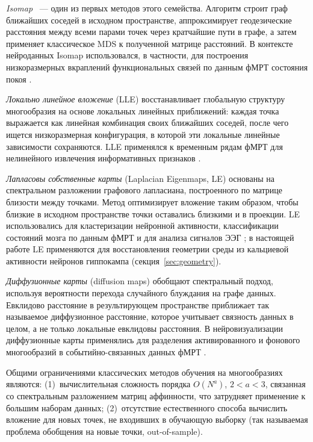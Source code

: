 \textit{Isomap} \cite{tenenbaum2000}~--- один из первых методов этого семейства. Алгоритм строит граф ближайших соседей в исходном пространстве, аппроксимирует геодезические расстояния между всеми парами точек через кратчайшие пути в графе, а затем применяет классическое MDS к полученной матрице расстояний.
В контексте нейроданных Isomap использовался, в частности, для построения низкоразмерных вкраплений функциональных связей по данным фМРТ состояния покоя \cite{gallos2021}.

\textit{Локально линейное вложение} (LLE) \cite{Roweis2000} восстанавливает глобальную структуру многообразия на основе локальных линейных приближений: каждая точка выражается как линейная комбинация своих ближайших соседей, после чего ищется низкоразмерная конфигурация, в которой эти локальные линейные зависимости сохраняются.
LLE применялся к временным рядам фМРТ для нелинейного извлечения информативных признаков \cite{mannfolk2010, Li2016}.

\textit{Лапласовы собственные карты} (Laplacian Eigenmaps, LE) \cite{Belkin2003} основаны на спектральном разложении графового лапласиана, построенного по матрице близости между точками.
Метод оптимизирует вложение таким образом, чтобы близкие в исходном пространстве точки оставались близкими и в проекции.
LE использовались для кластеризации нейронной активности, классификации состояний мозга по данным фМРТ \cite{Khosla2019} и для анализа сигналов ЭЭГ \cite{Ataee2007}; в настоящей работе LE применяются для восстановления геометрии среды из кальциевой активности нейронов гиппокампа (секция~\ref{sec:geometry}).

\textit{Диффузионные карты} (diffusion maps) \cite{coifman2006} обобщают спектральный подход, используя вероятности перехода случайного блуждания на графе данных.
Евклидово расстояние в результирующем пространстве приближает так называемое диффузионное расстояние, которое учитывает связность данных в целом, а не только локальные евклидовы расстояния.
В нейровизуализации диффузионные карты применялись для разделения активированного и фонового многообразий в событийно-связанных данных фМРТ \cite{shen2005}.

Общими ограничениями классических методов обучения на многообразиях являются: (1)~вычислительная сложность порядка $O(N^a)$, $2 < a < 3$, связанная со спектральным разложением матриц аффинности, что затрудняет применение к большим наборам данных; (2)~отсутствие естественного способа вычислить вложение для новых точек, не входивших в обучающую выборку (так называемая проблема обобщения на новые точки, out-of-sample).

